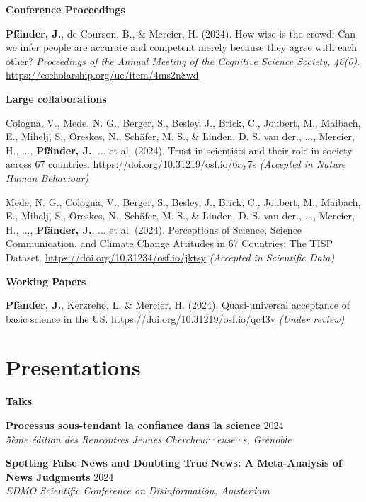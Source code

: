 \documentclass[letterpaper,11pt]{article}
\newcommand{\resumeItem}[1]{
  \item\small{
    {#1 \vspace{-2pt}}
  }
}
\newcommand{\resumeItemWithYear}[3][ ]{ %
  \item\small{
    #2 \hfill {\small #3} \\
    #1
  }
}
\newcommand{\resumePublicationHeading}[1]{
  \vspace{5pt} %
  \noindent\textbf{\small #1} %
  \vspace{2pt} %
}
\begin{document}
\resumePublicationHeading{Conference Proceedings}
\begin{enumerate}[label={[{\arabic*.}]}, left=0.15in, resume]
    \resumeItem{\textbf{Pfänder, J.\footnotemark[1]}, de Courson, B., & Mercier, H. (2024). How wise is the crowd: Can we infer people are accurate and competent merely because they agree with each other? \emph{Proceedings of the Annual Meeting of the Cognitive Science Society, 46(0)}. \url{https://escholarship.org/uc/item/4ms2n8wd}
    }

\end{enumerate}

\resumePublicationHeading{Large collaborations}
\begin{enumerate}[label={[{\arabic*.}]}, left=0.15in, resume]
    \resumeItem{Cologna, V., Mede, N. G., Berger, S., Besley, J., Brick, C., Joubert, M., Maibach, E., Mihelj, S., Oreskes, N., Schäfer, M. S., & Linden, D. S. van der., ..., Mercier, H., ..., \textbf{Pfänder, J.}, ... et al. (2024). Trust in scientists and their role in society across 67 countries. \url{https://doi.org/10.31219/osf.io/6ay7s} \emph{(Accepted in Nature Human Behaviour)}
    }
    \resumeItem{Mede, N. G., Cologna, V., Berger, S., Besley, J., Brick, C., Joubert, M., Maibach, E., Mihelj, S., Oreskes, N., Schäfer, M. S., & Linden, D. S. van der., ..., Mercier, H., ..., \textbf{Pfänder, J.}, ... et al. (2024). Perceptions of Science, Science Communication, and Climate Change Attitudes in 67 Countries: The TISP Dataset. \url{https://doi.org/10.31234/osf.io/jktsy} \emph{(Accepted in Scientific Data)}
    }

\end{enumerate}

\resumePublicationHeading{Working Papers}
\begin{enumerate}[label={[{\arabic*.}]}, left=0.15in, resume]
    \resumeItem{\textbf{Pfänder, J.\footnotemark[1]}, Kerzreho, L. & Mercier, H. (2024). Quasi-universal acceptance of basic science in the US. \url{https://doi.org/10.31219/osf.io/qc43v} \emph{(Under review)}
    }

\end{enumerate}


\section{Presentations}

\resumePublicationHeading{Talks}
\begin{enumerate}[label={[{\arabic*.}]}, left=0.15in]
    \resumeItemWithYear{\textbf{Processus sous-tendant la confiance dans la science}}{2024}{\textit{5ème édition des Rencontres Jeunes Chercheur·euse·s, Grenoble}}
    \resumeItemWithYear{\textbf{Spotting False News and Doubting True News: A Meta-Analysis of News Judgments}}{2024}{\textit{EDMO Scientific Conference on Disinformation, Amsterdam}}
\end{enumerate}
\end{document}
